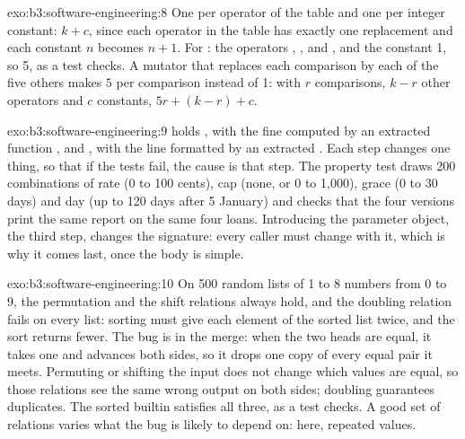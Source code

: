 \begin{solution}{exo:b3:software-engineering:8}
One  per operator of the table and one per integer constant: $k + c$, since each operator in the table has exactly one replacement and each constant $n$ becomes $n + 1$. For : the operators \code{+}, \code{*}, \code{<} and \code{-}, and the constant 1, so 5, as a test checks. A mutator that replaces each comparison by each of the five others makes $5$  per comparison instead of 1: with $r$ comparisons, $k - r$ other operators and $c$ constants, $5r + (k - r) + c$.
\end{solution}

\begin{solution}{exo:b3:software-engineering:9}
 holds , with the fine computed by an extracted function , and , with the line formatted by an extracted . Each step changes one thing, so that if the tests fail, the cause is that step. The property test draws 200 combinations of rate (0 to 100 cents), cap (none, or 0 to 1,000), grace (0 to 30 days) and day (up to 120 days after 5 January) and checks that the four versions print the same report on the same four loans. Introducing the parameter object, the third step, changes the signature: every caller must change with it, which is why it comes last, once the body is simple.
\end{solution}

\begin{solution}{exo:b3:software-engineering:10}
On 500 random lists of 1 to 8 numbers from 0 to 9, the permutation and the shift relations always hold, and the doubling relation fails on every list: sorting  must give each element of the sorted list twice, and the sort returns fewer. The bug is in the merge: when the two heads are equal, it takes one and advances both sides, so it drops one copy of every equal pair it meets. Permuting or shifting the input does not change which values are equal, so those relations see the same wrong output on both sides; doubling guarantees duplicates. The sorted builtin satisfies all three, as a test checks. A good set of relations varies what the bug is likely to depend on: here, repeated values.
\end{solution}

